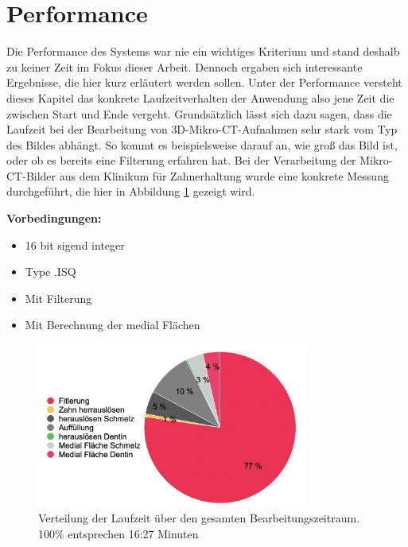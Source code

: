 \pagebreak

\section{Performance}
Die Performance des Systems war nie ein wichtiges Kriterium und stand deshalb zu
keiner Zeit im Fokus dieser Arbeit. Dennoch ergaben sich interessante Ergebnisse,
die hier kurz erläutert werden sollen. Unter der Performance versteht dieses Kapitel
das konkrete Laufzeitverhalten der Anwendung also jene Zeit die zwischen Start und
Ende vergeht. Grundsätzlich lässt sich dazu sagen, dass die Laufzeit bei der Bearbeitung
von \ac{3D}-Mikro-\ac{CT}-Aufnahmen sehr stark vom Typ des Bildes abhängt. So
kommt es beispielsweise darauf an, wie groß das Bild ist, oder ob es bereits
eine Filterung erfahren hat. Bei der Verarbeitung der Mikro-\ac{CT}-Bilder aus
dem Klinikum für Zahnerhaltung wurde eine konkrete Messung durchgeführt, die hier
in Abbildung \ref{fig:laufzeit} gezeigt wird.

\textbf{Vorbedingungen:}
\begin{itemize}
	\item 16 bit sigend integer

	\item Type .ISQ

	\item Mit Filterung

	\item Mit Berechnung der medial Flächen
\end{itemize}

\begin{figure}[h]
	\centering
	\includegraphics[width=0.8\textwidth]{img/laufzeit_diagramm.png}
	\caption{Verteilung der Laufzeit über den gesamten Bearbeitungszeitraum. 100\%
	entsprechen 16:27 Minuten}
	\label{fig:laufzeit}
\end{figure}

